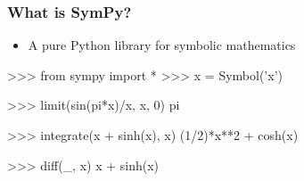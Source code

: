 \documentclass[handout]{beamer}
\begin{document}
\begin{frame}[fragile]
    \frametitle{What is SymPy?}

    \begin{itemize}
        \item A pure Python library for symbolic mathematics
    \end{itemize}

    \begin{python}
  >>> from sympy import *
  >>> x = Symbol('x')

  >>> limit(sin(pi*x)/x, x, 0)
  pi

  >>> integrate(x + sinh(x), x)
  (1/2)*x**2 + cosh(x)

  >>> diff(_, x)
  x + sinh(x)
    \end{python}
\end{frame}
\end{document}
